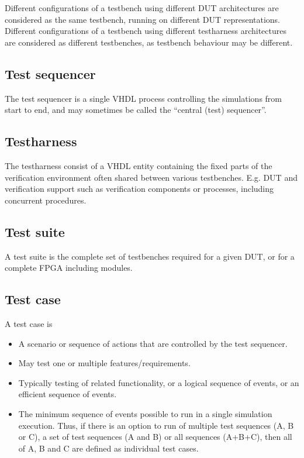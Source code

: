\documentclass[letterpaper,10pt,english]{sphinxmanual}
\begin{document}
\sphinxAtStartPar
Different configurations of a testbench using different DUT architectures are considered as the same
testbench, running on different DUT representations.
Different configurations of a testbench using different test\sphinxhyphen{}harness architectures are considered as
different testbenches, as testbench behaviour may be different.


\subsection{Test sequencer}
\label{\detokenize{intro:test-sequencer}}
\sphinxAtStartPar
The test sequencer is a single VHDL process controlling the simulations from start to end, and may sometimes
be called the “central (test) sequencer”.


\subsection{Test\sphinxhyphen{}harness}
\label{\detokenize{intro:test-harness}}
\sphinxAtStartPar
The test\sphinxhyphen{}harness consist of a VHDL entity containing the fixed parts of the verification environment \sphinxhyphen{} often shared
between various testbenches. E.g. DUT and verification support such as verification components or processes,
including concurrent procedures.


\subsection{Test suite}
\label{\detokenize{intro:test-suite}}
\sphinxAtStartPar
A test suite is the complete set of testbenches required for a given DUT, or for a complete FPGA including modules.


\subsection{Test case}
\label{\detokenize{intro:test-case}}
\sphinxAtStartPar
A test case is
\begin{itemize}
\item {} 
\sphinxAtStartPar
A scenario or sequence of actions that are controlled by the test sequencer.

\item {} 
\sphinxAtStartPar
May test one or multiple features/requirements.

\item {} 
\sphinxAtStartPar
Typically testing of related functionality, or a logical sequence of events, or an efficient sequence
of events.

\item {} 
\sphinxAtStartPar
The minimum sequence of events possible to run in a single simulation execution. Thus, if there is an option to
run of multiple test sequences (A, B or C), a set of test sequences (A and B) or all sequences (A+B+C), then all
of A, B and C are defined as individual test cases.

\end{itemize}
\end{document}
